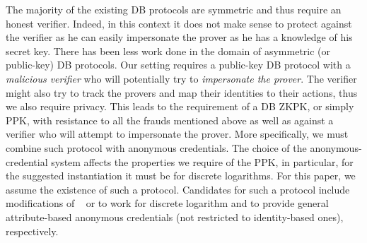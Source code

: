 The majority of the existing \ac{DB} protocols are symmetric and thus require an honest verifier.
Indeed, in this context it does not make sense to protect against the verifier as he can easily impersonate the prover as he has a knowledge of his secret key.
There has been less work done in the domain of asymmetric (or public-key) \ac{DB} protocols.
Our setting requires a public-key \ac{DB} protocol with a \emph{malicious verifier} who will potentially try to \emph{impersonate the prover}.
The verifier might also try to track the provers and map their identities to their actions, thus we also require privacy.
This leads to the requirement of a \ac{DB} \ac{ZKPK}, or simply \ac{PPK}, with resistance to all the frauds mentioned above as well as against a verifier who will attempt to impersonate the prover.
More specifically, we must combine such  protocol with anonymous 
credentials.
The choice of the anonymous-credential system affects the properties we 
require of the \ac{PPK}, in particular, for the suggested instantiation it must 
be  for discrete logarithms.
For this paper, we assume the existence of such a protocol. Candidates for such a protocol include modifications of ~\cite{ProProx} or  to work for discrete logarithm and to provide general attribute-based anonymous credentials (not restricted to identity-based ones), respectively.

